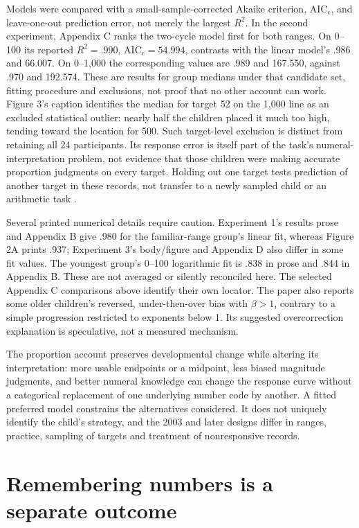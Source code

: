 Models were compared with a small-sample-corrected Akaike criterion,
\(\mathrm{AIC_c}\), and leave-one-out prediction error, not merely
the largest \(R^2\). In the second experiment, Appendix C ranks
the two-cycle model first for both ranges. On 0--100 its reported
\(R^2=.990\), \(\mathrm{AIC_c}=54.994\), contrasts with the
linear model's .986 and 66.007. On 0--1,000 the corresponding
values are .989 and 167.550, against .970 and 192.574.
These are results for group medians under that candidate set, fitting
procedure and exclusions, not proof that no other account can work.
Figure 3's caption identifies the median for target 52 on the
1,000 line as an excluded statistical outlier: nearly half the
children placed it much too high, tending toward the location for
500. Such target-level exclusion is distinct from retaining all
24 participants. Its response error is itself part of the task's
numeral-interpretation problem, not evidence that those children
were making accurate proportion judgments on every target.
Holding out one target tests prediction of another target in these
records, not transfer to a newly sampled child or an arithmetic task
\cite[Appendices A and C]{SlusserEtAl2012OnlineProportionNL}.

Several printed numerical details require caution. Experiment 1's
results prose and Appendix B give .980 for the familiar-range
group's linear fit, whereas Figure 2A prints .937; Experiment 3's
body/figure and Appendix D also differ in some fit values. The
youngest group's 0--100 logarithmic fit is .838 in prose and .844
in Appendix B. These are not averaged or silently reconciled here.
The selected Appendix C comparisons above identify their own locator.
The paper also reports some older children's reversed, under-then-over
bias with \(\beta>1\), contrary to a simple progression restricted
to exponents below 1. Its suggested overcorrection explanation is
speculative, not a measured mechanism.

The proportion account preserves developmental change while
altering its interpretation: more usable endpoints or a midpoint,
less biased magnitude judgments, and better numeral knowledge can
change the response curve without a categorical replacement of
one underlying number code by another. A fitted preferred model
constrains the alternatives considered. It does not uniquely identify
the child's strategy, and the 2003 and later designs differ in ranges,
practice, sampling of targets and treatment of nonresponsive records.

\section{Remembering numbers is a separate outcome}
\label{sec:p19-nl-memory}

